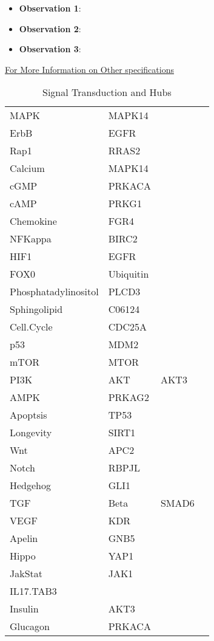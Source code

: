 	\vspace{8pt}
	\begin{itemize}
		\item \textbf{Observation 1}: 
		\item \textbf{Observation 2}:
		\item \textbf{Observation 3}:  
	\end{itemize}
	\href{CONTROL LINK GOES HERE}{For More Information on Other specifications}	

\begin{table}[H]\footnotesize
	\caption{Signal Transduction and Hubs}
	\begin{tabular}{p{2cm}p{2cm}p{1cm}}
		\hline	
		MAPK & MAPK14  & \cite{key400} \\
		ErbB & EGFR  & \cite{key400} \\
		Rap1 & RRAS2  & \cite{key400} \\
		Calcium & MAPK14  & \cite{key400} \\
		cGMP & PRKACA  & \cite{key400} \\
		cAMP & PRKG1  & \cite{key400} \\
		Chemokine & FGR4  & \cite{key400} \\
		NFKappa & BIRC2  & \cite{key400} \\
		HIF1 & EGFR  & \cite{key400} \\
		FOX0 & Ubiquitin  & \cite{key400} \\
		Phosphatadylinositol & PLCD3  & \cite{key400} \\
		Sphingolipid & C06124  & \cite{key400} \\
		Cell.Cycle & CDC25A  & \cite{key400} \\
		p53 & MDM2  & \cite{key400} \\
		mTOR & MTOR  & \cite{key400} \\
		PI3K & AKT & AKT3  & \cite{key400} \\
		AMPK & PRKAG2  & \cite{key400} \\
		Apoptsis & TP53  & \cite{key400} \\
		Longevity & SIRT1  & \cite{key400} \\
		Wnt & APC2  & \cite{key400} \\
		Notch & RBPJL  & \cite{key400} \\
		Hedgehog & GLI1  & \cite{key400} \\
		TGF & Beta & SMAD6  & \cite{key400} \\
		VEGF & KDR  & \cite{key400} \\
		Apelin & GNB5  & \cite{key400} \\
		Hippo & YAP1  & \cite{key400} \\
		JakStat & JAK1  & \cite{key400} \\
		IL17.TAB3  & \cite{key400} \\
		Insulin & AKT3  & \cite{key400} \\
		Glucagon & PRKACA  & \cite{key400} \\
		\hline
	\end{tabular}
	\label{tab:Table2}
\end{table}




